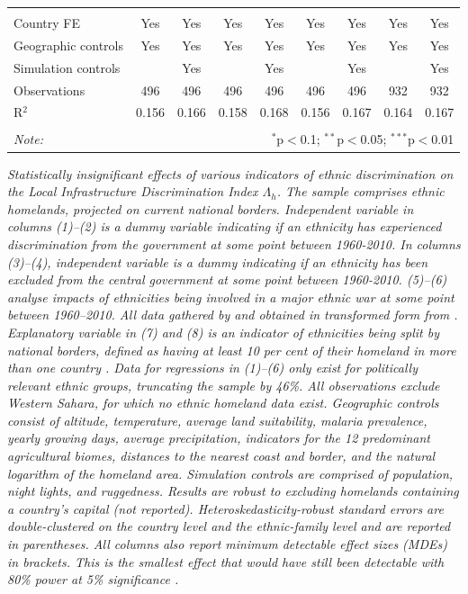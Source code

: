 \documentclass[11pt, oneside]{article}   	%
\newcommand{\mysubcaption}[1]{
\justify
\begin{spacing}{0.7}
\textit{\footnotesize #1}
\end{spacing}}
\begin{document}
\begin{table}[t]
{\begin{tabular}{@{\extracolsep{5pt}}lcccccccc}
    & & & & & & & & \\
  \hline \\[-1.8ex]
  Country FE & Yes & Yes & Yes & Yes & Yes & Yes & Yes & Yes \\
  Geographic controls & Yes & Yes & Yes & Yes & Yes & Yes & Yes & Yes \\
  Simulation controls &  & Yes &  & Yes &  & Yes &  & Yes \\
  Observations & 496 & 496 & 496 & 496 & 496 & 496 & 932 & 932 \\
  R$^{2}$ & 0.156 & 0.166 & 0.158 & 0.168 & 0.156 & 0.167 & 0.164 & 0.167 \\
  \hline
  \hline \\[-1.8ex]
  \textit{Note:}  & \multicolumn{8}{r}{$^{*}$p$<$0.1; $^{**}$p$<$0.05; $^{***}$p$<$0.01} \\
  \end{tabular}

}

\mysubcaption{Statistically insignificant effects of various indicators of ethnic discrimination on the Local Infrastructure Discrimination Index $\Lambda_{h}$. The sample comprises ethnic homelands, projected on current national borders. Independent variable in columns (1)--(2) is a dummy variable indicating if an ethnicity has experienced discrimination from the government at some point between 1960-2010. In columns (3)--(4), independent variable is a dummy indicating if an ethnicity has been excluded from the central government at some point between 1960-2010. (5)--(6) analyse impacts of ethnicities being involved in a major ethnic war at some point between 1960--2010. All data gathered by \cite{Vogt_IntegratingDataEthnicity_2015} and obtained in transformed form from \cite{Michalopoulos_LongRunEffectsScramble_2016}. Explanatory variable in (7) and (8) is an indicator of ethnicities being split by national borders, defined as having at least 10 per cent of their homeland in more than one country \citep[from][]{Michalopoulos_LongRunEffectsScramble_2016}. Data for regressions in  (1)--(6) only exist for politically relevant ethnic groups, truncating the sample by 46\%. All observations exclude Western Sahara, for which no ethnic homeland data exist. Geographic controls consist of altitude, temperature, average land suitability, malaria prevalence, yearly growing days, average precipitation, indicators for the 12 predominant agricultural biomes, distances to the nearest coast and border, and the natural logarithm of the homeland area.  Simulation controls are comprised of population, night lights, and ruggedness. Results are robust to excluding homelands containing a country's capital (not reported). Heteroskedasticity-robust standard errors are double-clustered on the country level and the ethnic-family level and are reported in parentheses. All columns also report minimum detectable effect sizes (MDEs) in brackets. This is the smallest effect that would have still been detectable with 80\% power at 5\% significance \citep{Haushofer_ShorttermImpactUnconditional_2016}.}
\end{table}
\end{document}
